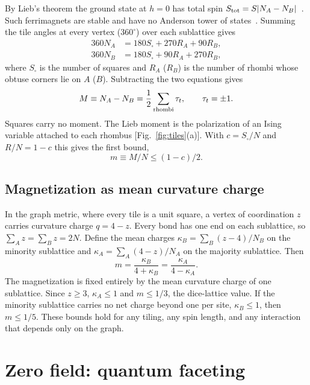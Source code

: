 \documentclass[aps,prb,twocolumn,superscriptaddress,floatfix]{revtex4-2}
\begin{document}
By Lieb's theorem the ground state at $h=0$ has total spin $S_{\rm tot}=S|N_A-N_B|$~\cite{LiebMattis1962,Lieb1989}. Such ferrimagnets are stable and have no Anderson tower of states~\cite{Rademaker2020}. Summing the tile angles at every vertex ($360^\circ$) over each sublattice gives
\begin{align}
360N_A&=180S_\square+270R_A+90R_B,\nonumber\\
360N_B&=180S_\square+90R_A+270R_B ,
\end{align}
where $S_\square$ is the number of squares and $R_A$ ($R_B$) is the number of rhombi whose obtuse corners lie on $A$ ($B$). Subtracting the two equations gives
\begin{equation}
M\equiv N_A-N_B=\frac12\sum_{\rm rhombi}\tau_t,\qquad \tau_t=\pm1 .
\label{eq:tau}
\end{equation}
Squares carry no moment. The Lieb moment is the polarization of an Ising variable attached to each rhombus [Fig.~\ref{fig:tiles}(a)]. With $c=S_\square/N$ and $R/N=1-c$ this gives the first bound,
\begin{equation}
m\equiv M/N\le(1-c)/2 .
\label{eq:mmax}
\end{equation}

\subsection{Magnetization as mean curvature charge}

In the graph metric, where every tile is a unit square, a vertex of coordination $z$ carries curvature charge $q=4-z$. Every bond has one end on each sublattice, so $\sum_A z=\sum_B z=2N$. Define the mean charges $\kappa_B=\sum_B(z-4)/N_B$ on the minority sublattice and $\kappa_A=\sum_A(4-z)/N_A$ on the majority sublattice. Then
\begin{equation}
m=\frac{\kappa_B}{4+\kappa_B}=\frac{\kappa_A}{4-\kappa_A} .
\label{eq:kappa}
\end{equation}
The magnetization is fixed entirely by the mean curvature charge of one sublattice. Since $z\ge3$, $\kappa_A\le1$ and $m\le1/3$, the dice-lattice value. If the minority sublattice carries no net charge beyond one per site, $\kappa_B\le1$, then $m\le1/5$. These bounds hold for any tiling, any spin length, and any interaction that depends only on the graph.

\section{Zero field: quantum faceting}\label{sec:zero}
\end{document}
